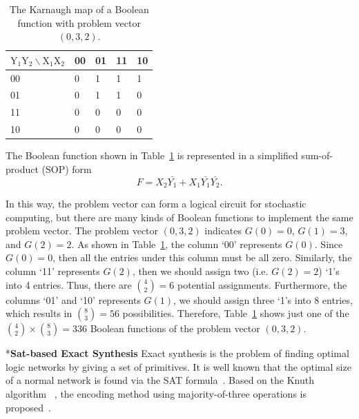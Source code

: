 \documentclass[conference,letterpaper]{IEEEtran}
\makeatletter
\renewcommand{\subsection}{\@startsection{subsection}{1}{0mm}
	{-\baselineskip}{0.001\baselineskip}{\bf\leftline}}
\makeatother
\begin{document}
\begin{table}[htbp]
\setlength{\abovecaptionskip}{0.cm}
\setlength{\belowcaptionskip}{0.pt}
\setlength{\tabcolsep}{1mm}
\caption{The Karnaugh map of a Boolean function with problem vector $(0, 3, 2)$.}
\centering \label{tab:tt}
\begin{tabularx}{\linewidth}{lXXXX}
\toprule
$\mathrm{Y}_{1} \mathrm{Y}_{2} \backslash \mathrm{X}_{1} \mathrm{X}_{2}$ & 00 & 01 & 11 & 10 \\
\midrule
00 &0 & 1 & 1 & 1 \\
01 &0 & 1 & 1 &0 \\
11 &0 & 0& 0&0 \\
10 &0 &0 & 0&0 \\
\bottomrule
\end{tabularx}
\end{table}

The Boolean function shown in Table~\ref{tab:tt} is represented in a simplified sum-of-product (SOP) form
\begin{equation}
F=X_{2}\bar{Y_{1}}+X_{1} \bar{Y_{1}}\bar{Y_{2}}.
\end{equation}

In this way, the problem vector can form a logical circuit for stochastic computing, but there are many kinds of Boolean functions to implement the same problem vector.
The problem vector $(0, 3, 2)$ indicates $G(0)=0$, $G(1)=3$, and $G(2)=2$.
As shown in Table~\ref{tab:tt}, the column `00' represents $G(0)$. Since $G(0)=0$, then all the entries under this column must be all zero.
Similarly, the column `11' represents $G(2)$, then we should assign two (i.e. $G(2)=2$) `1's into 4 entries. Thus, there are $\binom{4}{2}=6$ potential assignments.
Furthermore, the columns `01' and `10' represents $G(1)$, we should assign three `1's into 8 entries, which results in $\binom{8}{3}=56$ possibilities.
Therefore, Table~\ref{tab:tt} shows just one of the $\binom{4}{2} \times \binom{8}{3} = 336$ Boolean functions of the problem vector $(0, 3, 2)$.

\subsection*{\textbf{Sat-based Exact Synthesis}}
Exact synthesis is the problem of finding optimal logic networks by giving a set of primitives. 
It is well known that the optimal size of a normal network is found via the SAT formula~\cite{3}. Based on the Knuth algorithm ~\cite{4}, the encoding method using majority-of-three operations is proposed~\cite{6}. 
\end{document}
